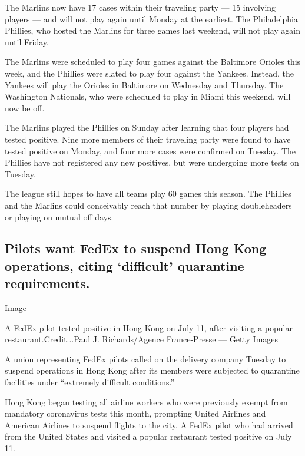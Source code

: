 The Marlins now have 17 cases within their traveling party --- 15
involving players --- and will not play again until Monday at the
earliest. The Philadelphia Phillies, who hosted the Marlins for three
games last weekend, will not play again until Friday.

The Marlins were scheduled to play four games against the Baltimore
Orioles this week, and the Phillies were slated to play four against the
Yankees. Instead, the Yankees will play the Orioles in Baltimore on
Wednesday and Thursday. The Washington Nationals, who were scheduled to
play in Miami this weekend, will now be off.

The Marlins played the Phillies on Sunday after learning that four
players had tested positive. Nine more members of their traveling party
were found to have tested positive on Monday, and four more cases were
confirmed on Tuesday. The Phillies have not registered any new
positives, but were undergoing more tests on Tuesday.

The league still hopes to have all teams play 60 games this season. The
Phillies and the Marlins could conceivably reach that number by playing
doubleheaders or playing on mutual off days.

\hypertarget{pilots-want-fedex-to-suspend-hong-kong-operations-citing-difficult-quarantine-requirements}{%
\subsection{Pilots want FedEx to suspend Hong Kong operations, citing
`difficult' quarantine
requirements.}\label{pilots-want-fedex-to-suspend-hong-kong-operations-citing-difficult-quarantine-requirements}}

Image

A FedEx pilot tested positive in Hong Kong on July 11, after visiting a
popular restaurant.Credit...Paul J. Richards/Agence France-Presse ---
Getty Images

A union representing FedEx pilots called on the delivery company Tuesday
to suspend operations in Hong Kong after its members were subjected to
quarantine facilities under ``extremely difficult conditions.''

Hong Kong began testing all airline workers who were previously exempt
from mandatory coronavirus tests this month, prompting United Airlines
and American Airlines to suspend flights to the city. A FedEx pilot who
had arrived from the United States and visited a popular restaurant
tested positive on July 11.

